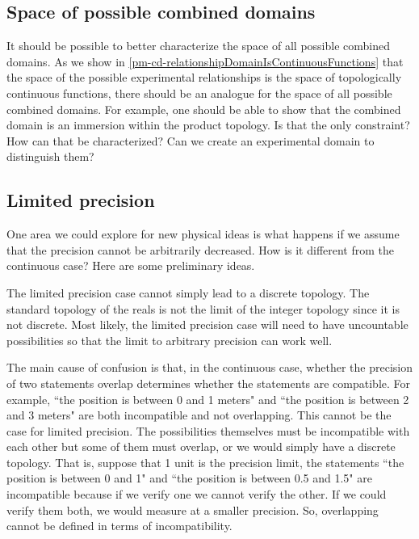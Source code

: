 \documentclass[11pt,letterpaper,fleqn]{memoir} %
\begin{document}
\subsection{Space of possible combined domains}

It should be possible to better characterize the space of all possible combined domains. As we show in \ref{pm-cd-relationshipDomainIsContinuousFunctions} that the space of the possible experimental relationships is the space of topologically continuous functions, there should be an analogue for the space of all possible combined domains. For example, one should be able to show that the combined domain is an immersion within the product topology. Is that the only constraint? How can that be characterized? Can we create an experimental domain to distinguish them?

\subsection{Limited precision}

One area we could explore for new physical ideas is what happens if we assume that the precision cannot be arbitrarily decreased. How is it different from the continuous case? Here are some preliminary ideas.

The limited precision case cannot simply lead to a discrete topology. The standard topology of the reals is not the limit of the integer topology since it is not discrete. Most likely, the limited precision case will need to have uncountable possibilities so that the limit to arbitrary precision can work well.

The main cause of confusion is that, in the continuous case, whether the precision of two statements overlap determines whether the statements are compatible. For example, ``the position is between 0 and 1 meters" and ``the position is between 2 and 3 meters" are both incompatible and not overlapping. This cannot be the case for limited precision. The possibilities themselves must be incompatible with each other but some of them must overlap, or we would simply have a discrete topology. That is, suppose that 1 unit is the precision limit, the statements ``the position is between 0 and 1" and ``the position is between 0.5 and 1.5" are incompatible because if we verify one we cannot verify the other. If we could verify them both, we would measure at a smaller precision. So, overlapping cannot be defined in terms of incompatibility.
\end{document}
